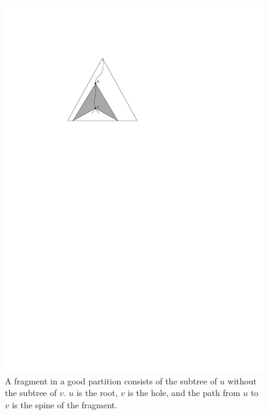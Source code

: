 \documentclass[a4paper,UKenglish]{lipics-v2016}
\theoremstyle{plain}
\begin{document}
\begin{figure}[ht]
\includegraphics[scale=0.7]{fragment}
\caption{A fragment in a good partition consists of the subtree of $u$ without the subtree of $v$.
$u$ is the root, $v$ is the hole, and the path from $u$ to $v$ is the spine of the fragment. \label{fig:fragment}}
\end{figure}
\end{document}
